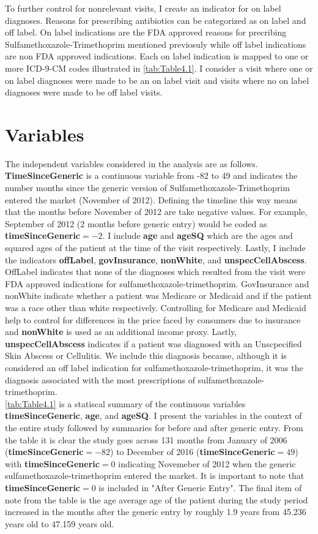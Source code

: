 \indent To further control for nonrelevant visits, I create an indicator for on label diagnoses. Reasons for prescribing antibiotics can be categorized as on label and off label. On label indications are the FDA approved reasons for precribing Sulfamethoxazole-Trimethoprim mentioned previosuly while off label indications are non FDA approved indications. Each on label indication is mapped to one or more ICD-9-CM codes illustrated in \autoref{tab:Table4.1}. I consider a visit where one or on label diagnoses were made to be an on label visit and visits where no on label diagnoses were made to be off label visits. 

\section{Variables}
The independent variables considered in the analysis are as follows. \textbf{TimeSinceGeneric} is a continuous variable from -82 to 49 and indicates the number months since the generic version of Sulfamethoxazole-Trimethoprim entered the market (November of 2012). Defining the timeline this way means that the months before November of 2012 are take negative values. For example, September of 2012 (2 months before generic entry) would be coded as \textbf{timeSinceGeneric}$=-2$. I include \textbf{age} and \textbf{ageSQ} which are the ages and squared ages of the patient at the time of the visit respectively. Lastly, I include the indicators \textbf{offLabel}, \textbf{govInsurance}, \textbf{nonWhite}, and \textbf{unspecCellAbscess}. OffLabel indicates that none of the diagnoses which resulted from the visit were FDA approved indications for sulfamethoxazole-trimethoprim. GovInsurance and nonWhite indicate whether a patient was Medicare or Medicaid and if the patient was a race other than white respectively. Controlling for Medicare and Medicaid help to control for differences in the price faced by consumers due to insurance and \textbf{nonWhite} is used as an additional income proxy. Lastly, \textbf{unspecCellAbscess} indicates if a patient was diagnosed with an Unscpecified Skin Abscess or Cellulitis. We include this diagnosis because, although it is considered an off label indication for sulfamethoxazole-trimethoprim, it was the diagnosis associated with the most prescriptions of sulfamethoxazole-trimethoprim.\\
\indent \autoref{tab:Table4.1} is a statiscal summary of the continuous variables \textbf{timeSinceGeneric}, \textbf{age}, and \textbf{ageSQ}. I present the variables in the context of the entire study followed by summaries for before and after generic entry. From the table it is clear the study goes across 131 months from January of 2006 (\textbf{timeSinceGeneric}$=-82$) to December of 2016 (\textbf{timeSinceGeneric}$=49$) with \textbf{timeSinceGeneric}$=0$ indicating Novemeber of 2012 when the generic sulfamethoxazole-trimethoprim entered the market. It is important to note that \textbf{timeSinceGeneric}$=0$ is included in "After Generic Entry". The final item of note from the table is the age average age of the patient during the study period increased in the months after the generic entry by roughly 1.9 years from 45.236 years old to 47.159 years old.\\
